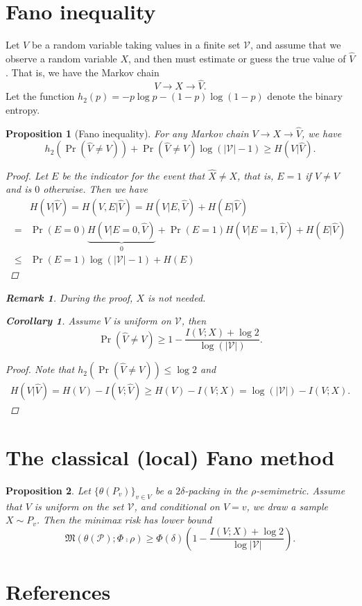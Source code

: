 \documentclass[11pt,letterpaper]{article}
\theoremstyle{plain}
\newtheorem{proposition}{\quad\quad Proposition}
\newtheorem{corollary}{\quad\quad Corollary}
\theoremstyle{definition}
\newtheorem{remark}{\quad\quad Remark}
\theoremstyle{remark}
\begin{document}
\section{Fano inequality}
Let $V$ be a random variable taking values in a finite set $\mathcal{V}$, and assume that we observe a random variable $X$, and then must estimate or guess the true value of $\hat{V}$. That is, we have the Markov chain
$$
V\rightarrow X\rightarrow \hat{V}.
$$
Let the function $h_2(p)=-p\log p-(1-p) \log (1-p)$ denote the binary entropy.
\begin{proposition}[Fano inequality] For any Markov chain $V\rightarrow X\rightarrow \hat{V}$, we have
    $$
    h_2(\Pr(\hat{V}\neq V))+\Pr(\hat{V}\neq V) \log (|\mathcal{V}|-1)\geq H(V|\hat{V}).
    $$
    \begin{proof}
        Let $E$ be the indicator for the event that $\hat{X}\neq X$, that is, $E=1$ if $\hat{V}\neq V$ and is $0$ otherwise.
        Then we have
        \begin{align*}
            &H(V|\hat{V})=H(V,E|\hat{V})=H(V|E,\hat{V})+H(E|\hat{V})\\
            =&\Pr(E=0)\underbrace{H(V|E=0,\hat{V})}_{0}+\Pr(E=1)H(V|E=1,\hat{V})+H(E|\hat{V})\\
            \leq& \Pr(E=1)\log(|\mathcal{V}|-1)+H(E)
        \end{align*}
    \end{proof}
\begin{remark}
During the proof, $X$ is not needed.
\end{remark}
    \begin{corollary}
        Assume $V$ is uniform on $\mathcal{V}$, then
        $$
        \Pr(\hat{V}\neq V)\geq 1-\frac{I(V;X)+\log 2}{\log(|\mathcal{V}|)}.
        $$
    \end{corollary}
    \begin{proof}
Note that $h_2(\Pr(\hat{V}\neq V))\leq \log 2$ and 
        \begin{align*}
            H(V|\hat{V})=H(V)-I(V;\hat{V})
            \geq H(V)-I(V;X)
            =\log(|\mathcal{V}|)-I(V;X).
        \end{align*}
    \end{proof}
    
\end{proposition}

\section{The classical (local) Fano method}
\begin{proposition}
    Let $\{\theta(P_v)\}_{v\in V}$ be a $2\delta$-packing in the $\rho$-semimetric. Assume that $V$ is uniform on the set $\mathcal{V}$, and conditional on $V=v$, we draw a sample $X\sim P_v$. Then the minimax risk has lower bound
    $$
    \mathfrak{M}(\theta(\mathcal{P});\Phi\comp \rho)\geq \Phi(\delta)\left(1-\frac{I(V;X)+\log 2}{\log |\mathcal{V}|}\right).
    $$
\end{proposition}


\section*{References}


\end{document}
